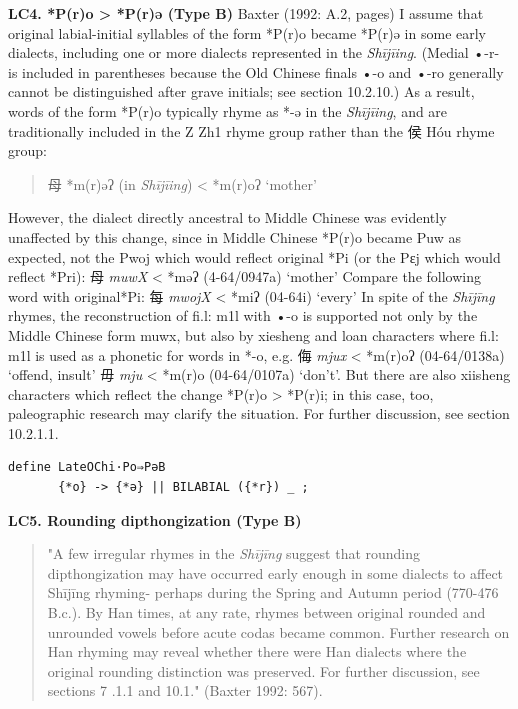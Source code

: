 \documentclass[xetex, svgnames, 12pt]{scrartcl}
\newcounter{para}
\newcommand\mypara[1]{\par\refstepcounter{para}\textbf{\thepara\space#1\space}}
\begin{document}
\mypara{LC4. *P(r)o > *P(r)ə  (Type B)}
Baxter (1992: A.2, pages) 
 I assume that original labial-initial syllables of the form *P(r)o became *P(r)ə in some early
 dialects, including one or more dialects represented in the \textit{Shījīing}. (Medial •-r- is included
 in parentheses because the Old Chinese finals •-o and •-ro generally cannot be distinguished
 after grave initials; see section 10.2.10.) As a result, words of the form *P(r)o
 typically rhyme as *-ə in the \textit{Shījīing}, and are traditionally included in the Z Zh1 rhyme
 group rather than the 侯 Hóu rhyme group:
 \begin{quote}
 母 *m(r)əʔ (in \textit{\textit{Shījīing}}) < *m(r)oʔ `mother'
 \end{quote}
 However, the dialect directly ancestral to Middle Chinese was evidently unaffected by this
 change, since in Middle Chinese *P(r)o became Puw as expected, not the Pwoj which
 would reflect original *Pi (or the Pɛj which would reflect *Pri):
 母 %
 \textit{muwX} < *məʔ (4-64/0947a) `mother'
 Compare the following word with original*Pi:
 每 %
 \textit{mwojX} < *miʔ (04-64i) `every'
 In spite of the \textit{Shījīng} rhymes, the reconstruction of fi.l: m1l with •-o is supported not only
 by the Middle Chinese form muwx, but also by xiesheng and loan characters where fi.l: m1l
 is used as a phonetic for words in *-o, e.g.
 侮 %
 \textit{mjux} < *m(r)oʔ (04-64/0138a)  `offend, insult'
 毋 %
 \textit{mju} < *m(r)o (04-64/0107a) `don't'.
 But there are also xiisheng characters which reflect the change *P(r)o > *P(r)i; in this case,
 too, paleographic research may clarify the situation. For further discussion, see section
 10.2.1.1.
 \begin{verbatim}
define LateOChi·Po⇒PəB 
       {*o} -> {*ə} || BILABIAL ({*r}) _ ;
 \end{verbatim}
 
\mypara{LC5. Rounding dipthongization (Type B)}
\citet[A03, 566-567]{Baxter1992}
\begin{quote}
 "A few irregular rhymes in the \textit{Shījīng} suggest that rounding dipthongization 
 may have occurred early enough in some dialects to affect Shījīng rhyming-
 perhaps during the Spring and Autumn period (770-476 B.c.). By Han times, at 
 any rate, rhymes between original rounded and unrounded vowels before acute 
 codas became common. Further research on Han rhyming may reveal whether 
 there were Han dialects where the original rounding distinction was 
 preserved. For further discussion, see sections 7 .1.1 and 10.1." (Baxter  1992: 567).
\end{quote}
\end{document}

